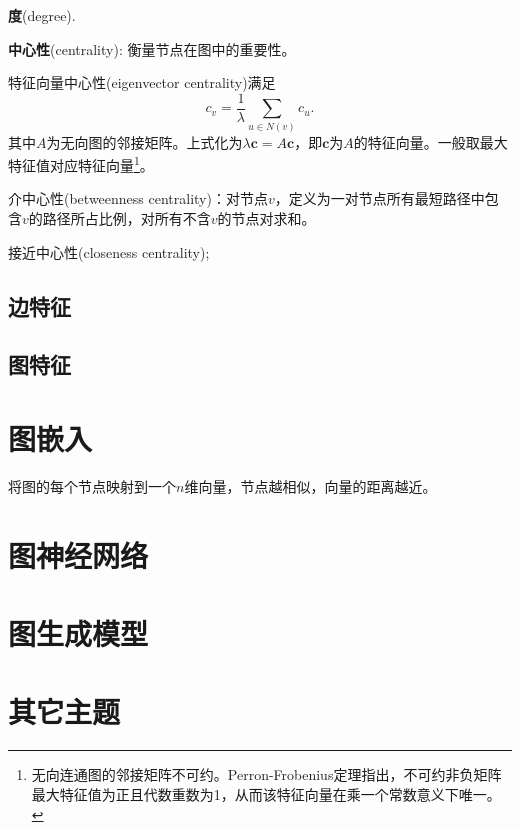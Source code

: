 \par \textbf{度}(degree).

\par \textbf{中心性}(centrality): 衡量节点在图中的重要性。
\par 特征向量中心性(eigenvector centrality)满足
\begin{equation}
    c_v=\frac{1}{\lambda}\sum_{u\in N(v)} c_u.
\end{equation}
其中$A$为无向图的邻接矩阵。上式化为$\lambda \mathbf{c}=A\mathbf{c}$，即$\mathbf{c}$为$A$的特征向量。一般取最大特征值对应特征向量\footnote{无向连通图的邻接矩阵不可约。Perron-Frobenius定理指出，不可约非负矩阵最大特征值为正且代数重数为1，从而该特征向量在乘一个常数意义下唯一。}。
\par 介中心性(betweenness centrality)：对节点$v$，定义为一对节点所有最短路径中包含$v$的路径所占比例，对所有不含$v$的节点对求和。
\par 接近中心性(closeness centrality);


\subsection{边特征}

\subsection{图特征}

\section{图嵌入}

\par 将图的每个节点映射到一个$n$维向量，节点越相似，向量的距离越近。

\section{图神经网络}

\section{图生成模型}

\section{其它主题}
